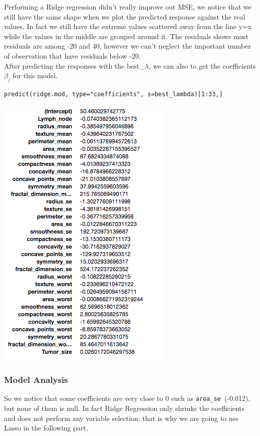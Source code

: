 \documentclass[]{report}
\begin{document}
Performing a Ridge regression didn't really improve out MSE, we notice that we still have the same shape when we plot the predicted response against the real values. In fact we still have the extreme values scattered away from the line y=x while the values in the middle are grouped around it. The residuals shows most residuals are among -20 and 40, however we can't neglect the important number of observation that have residuals below -20.\\

After predicting the responses with the best\_$\lambda$,  we can also to get the coefficients $\beta_{j}$ for this model.

\begin{lstlisting}
predict(ridge.mod, type="coefficients", s=best_lambda)[1:33,]
\end{lstlisting}

\begin{center}
	\includegraphics{Figures/ridge_coeff}
\end{center}

\subsubsection{Model Analysis}
So we notice that some coefficients are very close to 0 such as \texttt{area\_se }(-0.012), but none of them is null. In fact Ridge Regression only shrinks the coefficients and does not perform any variable selection;  that is why we are going to use Lasso in the following part.
\end{document}

